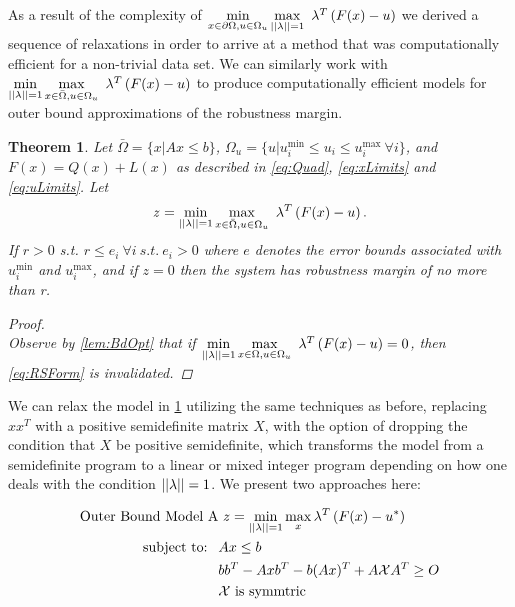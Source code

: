 \documentclass[11pt]{article}
\theoremstyle{plain}
\newtheorem{thm}{Theorem}[section]
\theoremstyle{definition}
\theoremstyle{remark}
\begin{document}
As a result of the complexity of $\min\limits_{x\in \partial \Omega, u\in\Omega_u}\max\limits_{||\bold{\lambda}||=1}\ \bold{\lambda}^T\left(F(x)-u\right)$ we derived a sequence of relaxations in order to arrive at a method that was computationally efficient for a non-trivial data set. We can similarly work with $\min\limits_{||\bold{\lambda}||=1}\max\limits_{x\in \bar{\Omega}, u\in\Omega_u}\ \bold{\lambda}^T\left(F(x)-u\right)$ to produce computationally efficient models for outer bound approximations of the robustness margin. \\
\begin{thm}\label{thm:OPTfeasOut} 
Let $\bar{\Omega}=\{x| Ax\leq b\}$, $\Omega_{u}=\{u| u^{\min}_i\leq u_i \leq u^{\max}_i \ \forall i \}$, and $F(x)=Q(x)+L(x)$ as described in \eqref{eq:Quad}, \eqref{eq:xLimits} and \eqref{eq:uLimits}. Let
$$z = \min\limits_{||\bold{\lambda}||=1}\max\limits_{x\in \bar{\Omega}, u\in\Omega_u}\ \bold{\lambda}^T\left(F(x)-u\right).$$
If $r>0$ s.t. $r\leq e_i \ \forall i \ s.t. \ e_i>0$ where $e$ denotes the error bounds associated with $ u^{\min}_i$ and $ u^{\max}_i$, and if $z=0$ then the system has robustness margin of no more than r.

\begin{proof} \ \\
Observe by \cref{lem:BdOpt} that if $\min\limits_{||\bold{\lambda}||=1}\max\limits_{x\in \Omega, u\in\Omega_u}\ \bold{\lambda}^T\left(F(x)-u\right)=0$, then \eqref{eq:RSForm} is invalidated.  

\end{proof}
\end{thm}

We can relax the model in \cref{thm:OPTfeasOut} utilizing the same techniques as before, replacing $xx^T$ with a positive semidefinite matrix $X$, with the option of dropping the condition that $X$ be positive semidefinite, which transforms the model from a semidefinite program to a linear or mixed integer program depending on how one deals with the condition $||\bold{\lambda}||=1$. We present two approaches here:

\begin{subequations}\label{eq:OPTfeasOutRelaxa}
\begin{align}
\text{Outer Bound Model A}& \ z=\min\limits_{||\bold{\lambda}||=1}\max\limits_{x}  \bold{\lambda}^T\left(F(x)-u^*\right)\\
 \text{subject to: } \ & Ax\leq b \\
 	&bb^T-Axb^T-b(Ax)^T+A\mathcal{X}A^T\geq O \\
 	&\mathcal{X} \text{ is symmtric}
\end{align}
\end{subequations}
\end{document}
